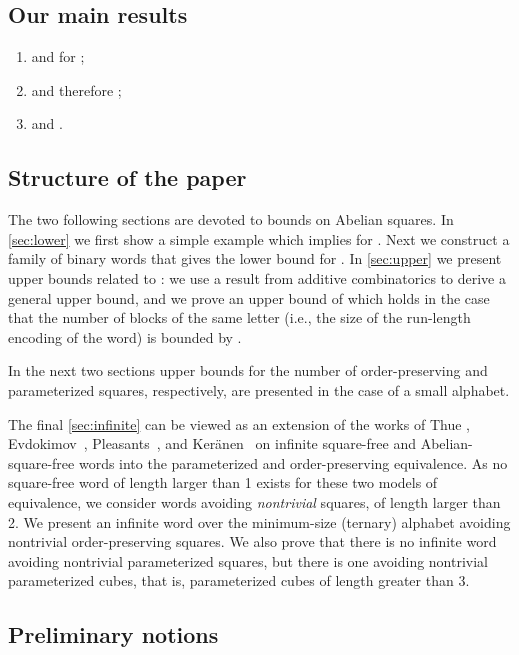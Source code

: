 \documentclass{article}
\theoremstyle{plain}
\theoremstyle{definition}
\theoremstyle{remark}
\begin{document}
  \subsection*{Our main results}
  \begin{enumerate}[1.]
    \item  and  for ;
    \item  and therefore ;
    \item  
      and .
  \end{enumerate}

  \subsection*{Structure of the paper}
  The two following sections are devoted to bounds on Abelian squares.
  In \cref{sec:lower} we first show a simple example which implies  for .
  Next we construct a family of binary words that gives the lower bound  for .
  In \cref{sec:upper} we present upper bounds related to :
  we use a result from additive combinatorics to derive a general  upper bound,
  and we prove an upper bound of  which holds in the case that the number of blocks
  of the same letter (i.e., the size of the run-length encoding of the word) is bounded by .  

  In the next two sections upper bounds for the number of order-preserving and parameterized squares,
  respectively, are presented in the case of a small alphabet.

  The final \cref{sec:infinite} can be viewed as an extension of the
  works of Thue \cite{Thue}, Evdokimov~\cite{evdokimov}, Pleasants~\cite{Pleasants}, and Ker\"anen~\cite{DBLP:conf/icalp/Keranen92}
  on infinite square-free and Abelian-square-free words into the parameterized and order-preserving equivalence.
  As no square-free word of length larger than 1 exists for these two models of equivalence,
  we consider words avoiding \emph{nontrivial} squares, of length larger than 2.
  We present an infinite word over the minimum-size (ternary) alphabet
  avoiding nontrivial order-preserving squares.
  We also prove that there is no infinite word avoiding nontrivial parameterized squares,
  but there is one avoiding nontrivial parameterized cubes, that is,
  parameterized cubes of length greater than 3.

  \subsection*{Preliminary notions}
\end{document}
